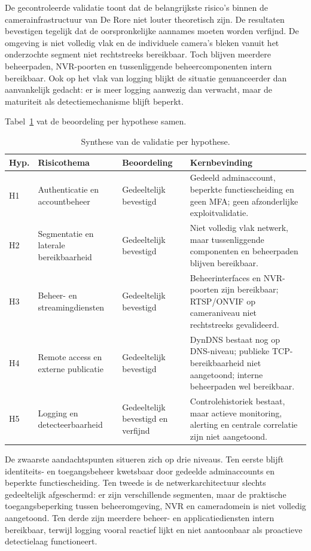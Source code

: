 De gecontroleerde validatie toont dat de belangrijkste risico's binnen de camerainfrastructuur van De Rore niet louter theoretisch zijn. De resultaten bevestigen tegelijk dat de oorspronkelijke aannames moeten worden verfijnd. De omgeving is niet volledig vlak en de individuele camera's bleken vanuit het onderzochte segment niet rechtstreeks bereikbaar. Toch blijven meerdere beheerpaden, NVR-poorten en tussenliggende beheercomponenten intern bereikbaar. Ook op het vlak van logging blijkt de situatie genuanceerder dan aanvankelijk gedacht: er is meer logging aanwezig dan verwacht, maar de maturiteit als detectiemechanisme blijft beperkt.

Tabel~\ref{tab:synthese-validatie} vat de beoordeling per hypothese samen.

\begin{table}[htbp]
    \centering
    \small
    \caption[Synthese van de validatie per hypothese]{Synthese van de validatie per hypothese.}
    \label{tab:synthese-validatie}
    \begin{tabular}{p{}p{}p{}p{}}
        \hline
        \textbf{Hyp.} & \textbf{Risicothema} & \textbf{Beoordeling} & \textbf{Kernbevinding} \\
        \hline
        H1 & Authenticatie en accountbeheer & Gedeeltelijk bevestigd & Gedeeld adminaccount, beperkte functiescheiding en geen MFA; geen afzonderlijke exploitvalidatie. \\
        H2 & Segmentatie en laterale bereikbaarheid & Gedeeltelijk bevestigd & Niet volledig vlak netwerk, maar tussenliggende componenten en beheerpaden blijven bereikbaar. \\
        H3 & Beheer- en streamingdiensten & Gedeeltelijk bevestigd & Beheerinterfaces en NVR-poorten zijn bereikbaar; RTSP/ONVIF op cameraniveau niet rechtstreeks gevalideerd. \\
        H4 & Remote access en externe publicatie & Gedeeltelijk bevestigd & DynDNS bestaat nog op DNS-niveau; publieke TCP-bereikbaarheid niet aangetoond; interne beheerpaden wel bereikbaar. \\
        H5 & Logging en detecteerbaarheid & Gedeeltelijk bevestigd en verfijnd & Controlehistoriek bestaat, maar actieve monitoring, alerting en centrale correlatie zijn niet aangetoond. \\
        \hline
    \end{tabular}
\end{table}

De zwaarste aandachtspunten situeren zich op drie niveaus. Ten eerste blijft identiteits- en toegangsbeheer kwetsbaar door gedeelde adminaccounts en beperkte functiescheiding. Ten tweede is de netwerkarchitectuur slechts gedeeltelijk afgeschermd: er zijn verschillende segmenten, maar de praktische toegangsbeperking tussen beheeromgeving, NVR en cameradomein is niet volledig aangetoond. Ten derde zijn meerdere beheer- en applicatiediensten intern bereikbaar, terwijl logging vooral reactief lijkt en niet aantoonbaar als proactieve detectielaag functioneert.

